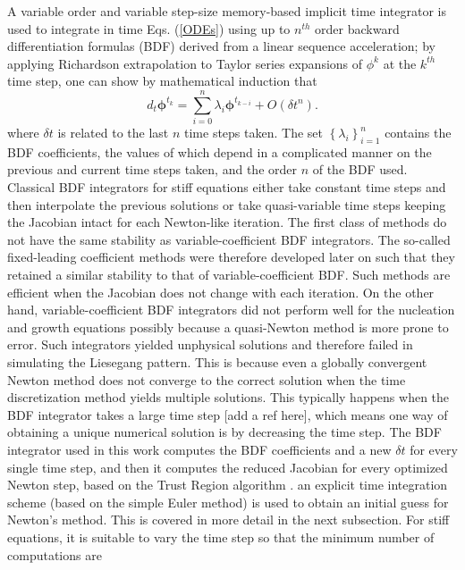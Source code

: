\documentclass[aps,preprint]{revtex4}
\begin{document}
A variable order and variable step-size memory-based implicit time integrator
is used to integrate in time Eqs. (\ref{ODEs}) using up to $n^{th}$ order
backward differentiation formulas (BDF) derived from a linear sequence
acceleration; by applying Richardson extrapolation to Taylor series expansions
of $\phi^{k}$ at the $k^{th}$ time step, one can show by mathematical induction that
\begin{equation}
d_{t}\mathbf{\phi}^{t_{k}} = \sum_{i=0}^{n}\lambda_{i}\mathbf{\phi}^{t _{k-i}
}+O\left(  \delta t ^{n}\right)  .\label{ODE}
\end{equation}
where $\delta t $ is related to the last $n$ time steps taken. The set
$\left\{  \lambda_{i}\right\} _{i=1}^{n}$ contains the BDF coefficients, the
values of which depend in a complicated manner on the previous and current
time steps taken, and the order $n$ of the BDF used. Classical BDF integrators
for stiff equations either take constant time steps \cite{Gear} and then
interpolate the previous solutions or take quasi-variable time steps keeping
the Jacobian intact for each Newton-like iteration. The first class of methods
do not have the same stability as variable-coefficient BDF integrators. The
so-called fixed-leading coefficient \cite{FLC1,FLC2} methods were therefore
developed later on such that they retained a similar stability to that of
variable-coefficient BDF. Such methods are efficient when the Jacobian does
not change with each iteration. On the other hand, variable-coefficient BDF
integrators did not perform well for the nucleation and growth equations
possibly because a quasi-Newton method is more prone to error. Such
integrators yielded unphysical solutions and therefore failed in simulating
the Liesegang pattern. This is because even a globally convergent Newton
method does not converge to the correct solution when the time discretization
method yields multiple solutions. This typically happens when the BDF
integrator takes a large time step [add a ref here], which means one way of
obtaining a unique numerical solution is by decreasing the time step. The BDF
integrator used in this work computes the BDF coefficients and a new $\delta
t$ for every single time step, and then it computes the reduced Jacobian for
every optimized Newton step, based on the Trust Region algorithm
\cite{Optimization}. an explicit time integration scheme (based on the simple
Euler method) is used to obtain an initial guess for Newton's method. This is
covered in more detail in the next subsection. For stiff equations, it is
suitable to vary the time step so that the minimum number of computations are
\end{document}
